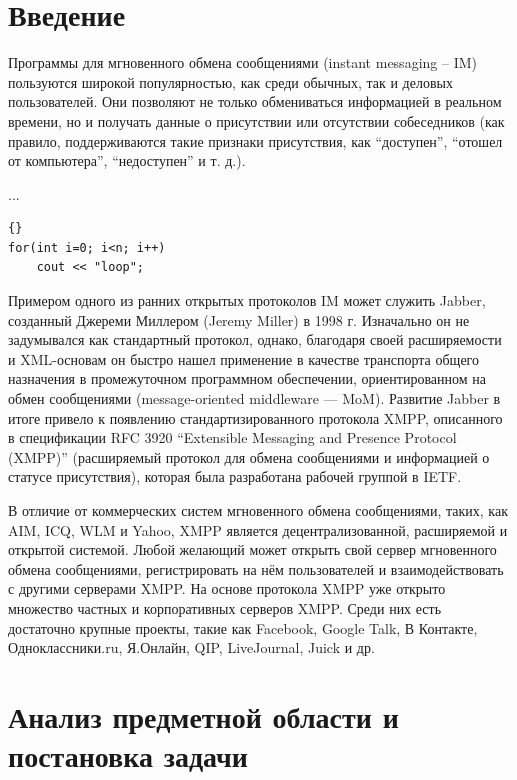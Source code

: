 \documentclass{khaireport}
\begin{document}
\maketitle

\tableofcontents\newpage

\chapter*{Введение}
Программы для мгновенного обмена сообщениями (instant messaging – IM) пользуются широкой популярностью, как среди обычных, так и деловых пользователей. Они позволяют не только обмениваться информацией в реальном времени, но и получать данные о присутствии или отсутствии собеседников (как правило, поддерживаются такие признаки присутствия, как ``доступен'', ``отошел от компьютера'', ``недоступен'' и т. д.).

\lstset{language=C++}
...
\begin{lstlisting}{}
for(int i=0; i<n; i++)
    cout << "loop";
\end{lstlisting}

Примером одного из ранних открытых протоколов IM может служить Jabber, созданный Джереми Миллером (Jeremy Miller) в 1998 г. Изначально он не задумывался как стандартный протокол, однако, благодаря своей расширяемости и XML-основам он быстро нашел применение в качестве транспорта общего назначения в промежуточном программном обеспечении, ориентированном на обмен сообщениями (message-oriented middleware — MoM). Развитие Jabber в итоге привело к появлению стандартизированного протокола XMPP, описанного в спецификации RFC 3920 ``Extensible Messaging and Presence Protocol (XMPP)'' (расширяемый протокол для обмена сообщениями и информацией о статусе присутствия), которая была разработана рабочей группой в IETF.

В отличие от коммерческих систем мгновенного обмена сообщениями, таких, как AIM, ICQ, WLM и Yahoo, XMPP является децентрализованной, расширяемой и открытой системой. Любой желающий может открыть свой сервер мгновенного обмена сообщениями, регистрировать на нём пользователей и взаимодействовать с другими серверами XMPP. На основе протокола XMPP уже открыто множество частных и корпоративных серверов XMPP. Среди них есть достаточно крупные проекты, такие как Facebook, Google Talk, В Контакте, Одноклассники.ru, Я.Онлайн, QIP, LiveJournal, Juick и др.

\chapter{Анализ предметной области и постановка задачи}
\end{document}
